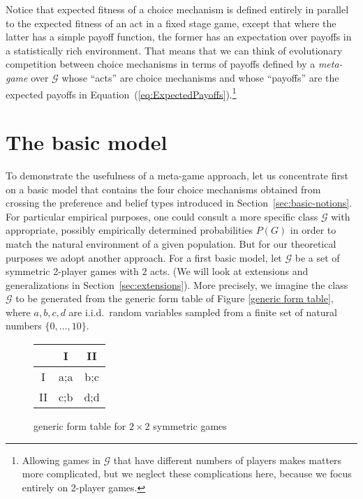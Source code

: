 \documentclass[fleqn,reqno,11pt]{article}
\begin{document}
Notice that expected fitness of a choice mechanism is defined entirely in parallel to the
expected fitness of an act in a fixed stage game, except that where the latter has a simple
payoff function, the former has an expectation over payoffs in a statistically rich
environment. That means that we can think of evolutionary competition between choice mechanisms
in terms of payoffs defined by a \emph{meta-game} over $\mathcal{G}$ whose ``acts'' are choice
mechanisms and whose ``payoffs'' are the expected payoffs in
Equation~(\ref{eq:ExpectedPayoffs}).\footnote{Allowing games in $\mathcal{G}$ that have
  different numbers of players makes matters more complicated, but we neglect these
  complications here, because we focus entirely on 2-player games.}


\section{The basic model}
\label{sec:basic-model-1}

To demonstrate the usefulness of a meta-game approach, let us concentrate first on a basic
model that contains the four choice mechanisms obtained from crossing the preference and belief
types introduced in Section~\ref{sec:basic-notions}.  For particular empirical purposes, one
could consult a more specific class $\mathcal{G}$ with appropriate, possibly empirically
determined probabilities $P(G)$ in order to match the natural environment of a given
population. But for our theoretical purposes we adopt another approach. For a first basic
model, let $\mathcal{G}$ be a set of symmetric 2-player games with $2$ acts. (We will look at
extensions and generalizations in Section~\ref{sec:extensions}). More precisely, we imagine the
class $\mathcal{G}$ to be generated from the generic form table of Figure \ref{generic form
  table}, where $a,b,c,d$ are i.i.d.~random variables sampled from a finite set of natural
numbers $ \lbrace 0, \dots, 10 \rbrace$.


\begin{figure}
\begin{center}%
\begin{tabular}{|c|c|c|}
\hline 
 & I & II\tabularnewline
\hline 
\hline 
I & a;a & b;c\tabularnewline
\hline 
II & c;b & d;d\tabularnewline
\hline 
\end{tabular}\end{center}

\protect\caption{generic form table for $2 \times 2$ symmetric games}
\label{generic form table}
\end{figure}
\end{document}
